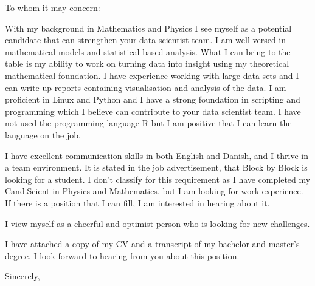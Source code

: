 \documentclass[10pt,a4paper]{letter}
\begin{document}
\begin{letter}{}
\opening{To whom it may concern:}

With my background in Mathematics and Physics I see myself as a potential candidate that can strengthen your data scientist team. I am well versed in mathematical models and statistical based analysis. What I can bring to the table is my ability to work on turning data into insight using my theoretical mathematical foundation. I have experience working with large data-sets and I can write up reports containing visualisation and analysis of the data. I am proficient in Linux and Python and I have a strong foundation in scripting and programming which I believe can contribute to your data scientist team. I have not used the programming language R but I am positive that I can learn the language on the job.
 
I have excellent communication skills in both English and Danish, and I thrive in a team environment. It is stated in the job advertisement, that Block by Block is looking for a student. I don't classify for this requirement as I have completed my Cand.Scient in Physics and Mathematics, but I am looking for work experience. If there is a position that I can fill, I am interested in hearing about it.

I view myself as a cheerful and optimist person who is looking for new challenges.

I have attached a copy of my CV and a transcript of my bachelor and master's degree. I look forward to hearing from you about this position.   

\closing{Sincerely,}

\end{letter}

\end{document}
